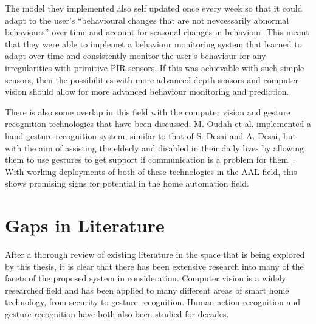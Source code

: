The model they implemented also self updated once every week so that it could adapt to the user's ``behavioural changes that are not nevcessarily abnormal behaviours'' over time and account for seasonal changes in behaviour.
This meant that they were able to implemet a behaviour monitoring system that learned to adapt over time and consistently monitor the user's behaviour for any irregularities with primitive PIR sensors.
If this was achievable with such simple sensors, then the possibilities with more advanced depth sensors and computer vision should allow for more advanced behaviour monitoring and prediction.

There is also some overlap in this field with the computer vision and gesture recognition technologies that have been discussed.
M. Oudah et al. implemented a hand gesture recognition system, similar to that of S. Desai and A. Desai, but with the aim of assisting the elderly and disabled in their daily lives by allowing them to use gestures to get support if communication is a problem for them~\cite{Ouda21}.
With working deployments of both of these technologies in the AAL field, this shows promising signs for potential in the home automation field.



\section{Gaps in Literature}
After a thorough review of existing literature in the space that is being explored by this thesis, it is clear that there has been extensive research into many of the facets of the proposed system in consideration.
Computer vision is a widely researched field and has been applied to many different areas of smart home technology, from security to gesture recognition.
Human action recognition and gesture recognition have both also been studied for decades.

